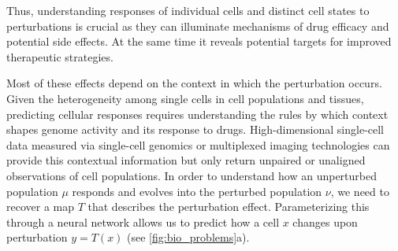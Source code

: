Thus, understanding responses of individual cells and distinct cell states to perturbations is crucial as they can illuminate mechanisms of drug efficacy and potential side effects.
At the same time it reveals potential targets for improved therapeutic strategies. 

Most of these effects depend on the context in which the perturbation occurs. Given the heterogeneity among single cells in cell populations and tissues, predicting cellular responses requires understanding the rules by which context shapes genome activity and its response to drugs. High-dimensional single-cell data measured via single-cell genomics or multiplexed imaging technologies can provide this contextual information but only return unpaired or unaligned observations of cell populations.
In order to understand how an unperturbed population $\mu$ responds and evolves into the perturbed population $\nu$, we need to recover a map $T$ that describes the perturbation effect. Parameterizing this through a neural network allows us to predict how a cell $x$ changes upon perturbation $y= T(x)$ (see \cref{fig:bio_problems}a).



